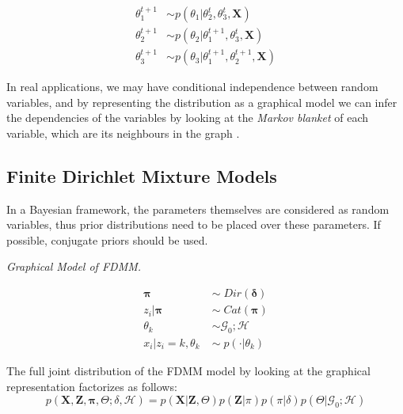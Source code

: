 \begin{equation} \label{gibbs-f-bayes}
  \begin{aligned}
	\theta_{1}^{t+1} & \sim p(\theta_{1} | \theta_{2}^{t}, \theta_{3}^{t}, \mathbf{X}) \\
	\theta_{2}^{t+1} & \sim p(\theta_{2} | \theta_{1}^{t+1}, \theta_{3}^{t}, \mathbf{X}) \\
	\theta_{3}^{t+1} & \sim p(\theta_{3} | \theta_{1}^{t+1}, \theta_{2}^{t+1}, \mathbf{X}) 
  \end{aligned}
\end{equation}

In real applications, we may have conditional independence between random variables, and by representing the distribution as a graphical model we can infer the dependencies of the variables by looking at the \emph{Markov blanket} of each variable, which are its neighbours in the graph \cite[Ch. 24]{Murphy2012}. 

\subsection{Finite Dirichlet Mixture Models}
In a Bayesian framework, the parameters themselves are considered as random variables, thus prior distributions need to be placed over these parameters. If possible, conjugate priors should be used.

 

\begin{minipage}{0.6\textwidth}%
  \hfill
  \begin{center}
	
	\emph{Graphical Model of FDMM.}
  \end{center}
\end{minipage}
\begin{minipage}{0.1\textwidth}%
  \begin{equation*}
  	\begin{aligned}
  		\mathbf{\pi} \; & \sim \; Dir(\mathbf{\delta}) \\
  		z_{i}|\mathbf{\pi} \; & \sim \; Cat(\mathbf{\pi}) \\
  		\theta_{k} \; & \sim \mathcal{G}_{0}; \mathcal{H} \\
  		x_{i}|z_{i}=k,\theta_{k} \; & \sim \; p(\cdot | \theta_{k})  
  	\end{aligned} 
  \end{equation*} 
\end{minipage}

\vspace*{5mm}
The full joint distribution of the FDMM model by looking at the graphical representation factorizes as follows:
\begin{equation}%
	p(\mathbf{X},\mathbf{Z},\mathbf{\pi},\Theta;\delta,\mathcal{H}) = p(\mathbf{X}|\mathbf{Z},\Theta) p(\mathbf{Z}|\pi) p(\pi|\delta) p(\Theta |\mathcal{G}_{0}; \mathcal{H})
\end{equation}

